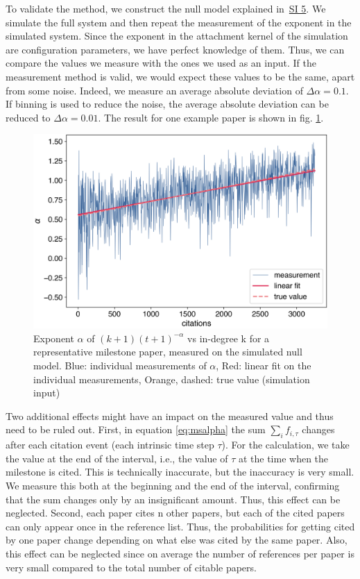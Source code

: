 \documentclass[draft,final]{vutinfth} %
\begin{document}
To validate the method, we construct the null model explained in~\hyperref[SI5]{SI 5}. We simulate the full system and then repeat the measurement of the exponent in the simulated system. Since the exponent in the attachment kernel of the simulation are configuration parameters, we have perfect knowledge of them. Thus, we can compare the values we measure with the ones we used as an input. If the measurement method is valid, we would expect these values to be the same, apart from some noise. Indeed, we measure an average absolute deviation of $\Delta\alpha=0.1$. If binning is used to reduce the noise, the average absolute deviation can be reduced to $\Delta\alpha=0.01$. The result for one example paper is shown in fig. \ref{fig_mspexp}.

\begin{figure}[!ht]
	\centering
	 \includegraphics[width=0.7\columnwidth]{figures_aps/7.png}
	\caption{Exponent $\alpha$ of $(k+1)(t + 1)^{-\alpha}$ vs in-degree k for a representative milestone paper, measured on the simulated null model. Blue: individual measurements of $\alpha$, Red: linear fit on the individual measurements, Orange, dashed: true value (simulation input)
	}
	\label{fig_mspexp}
\end{figure}

Two additional effects might have an impact on the measured value and thus need to be ruled out. First, in equation \ref{eq:msalpha} the sum $\sum_i f_{i,\tau}$ changes after each citation event (each intrinsic time step $\tau$). For the calculation, we take the value at the end of the interval, i.e., the value of $\tau$ at the time when the milestone is cited. This is technically inaccurate, but the inaccuracy is very small. We measure this both at the beginning and the end of the interval, confirming that the sum changes only by an insignificant amount. Thus, this effect can be neglected.
Second, each paper cites n other papers, but each of the cited papers can only appear once in the reference list. Thus, the probabilities for getting cited by one paper change depending on what else was cited by the same paper. Also, this effect can be neglected since on average the number of references per paper is very small compared to the total number of citable papers. 
\end{document}
